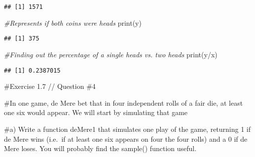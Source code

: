 \documentclass[
]{article}
\newenvironment{Shaded}{\begin{snugshade}}{\end{snugshade}}
\newcommand{\CommentTok}[1]{\textcolor[rgb]{0.56,0.35,0.01}{\textit{#1}}}
\newcommand{\FunctionTok}[1]{\textcolor[rgb]{0.00,0.00,0.00}{#1}}
\newcommand{\NormalTok}[1]{#1}
\newcommand{\SpecialCharTok}[1]{\textcolor[rgb]{0.00,0.00,0.00}{#1}}
\begin{document}
\begin{verbatim}
## [1] 1571
\end{verbatim}

\begin{Shaded}
\begin{Highlighting}[]
\CommentTok{\#Represents if both coins were heads}
\FunctionTok{print}\NormalTok{(y)}
\end{Highlighting}
\end{Shaded}

\begin{verbatim}
## [1] 375
\end{verbatim}

\begin{Shaded}
\begin{Highlighting}[]
\CommentTok{\#Finding out the percentage of a single heads vs. two heads}
\FunctionTok{print}\NormalTok{(y}\SpecialCharTok{/}\NormalTok{x)}
\end{Highlighting}
\end{Shaded}

\begin{verbatim}
## [1] 0.2387015
\end{verbatim}

\#Exercise 1.7 // Question \#4

\#In one game, de Mere bet that in four independent rolls of a fair die,
at least one six would appear. We will start by simulating that game

\#a) Write a function deMere1 that simulates one play of the game,
returning 1 if de Mere wins (i.e.~if at least one six appears on four
the four rolls) and a 0 if de Mere loses. You will probably find the
sample() function useful.
\end{document}
